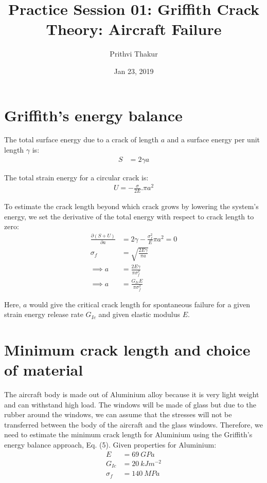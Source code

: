 \documentclass[11pt]{article}
\title{Practice Session 01: Griffith Crack Theory: Aircraft Failure}
\author{Prithvi Thakur}
\date{Jan 23, 2019}
\begin{document}
\maketitle

\section*{Griffith's energy balance}
The total surface energy due to a crack of length $a$ and a surface energy per unit length $\gamma$ is:
\begin{align}
    S &= 2\gamma a
\end{align}

The total strain energy for a circular crack is:
\begin{align}
    U = -\frac{\sigma}{2E}.\pi a^2
\end{align}

To estimate the crack length beyond which crack grows by lowering the system's energy, we set the derivative of the total energy with respect to crack length to zero:
\begin{align}
    \frac{\partial (S+U)}{\partial a} &= 2\gamma - \frac{\sigma_f^2}{E}\pi a^2 = 0 \\
    \sigma_f &= \sqrt{\frac{2E\gamma}{\pi a}} \\
    \implies a &= \frac{2E\gamma}{\pi \sigma_f^2} \\
    \implies a &= \frac{G_{Ic}E}{\pi \sigma_f^2}
\end{align}

Here, $a$ would give the critical crack length for spontaneous failure for a given strain energy release rate $G_{Ic}$ and given elastic modulus $E$.

\section*{Minimum crack length and choice of material}
The aircraft body is made out of Aluminium alloy because it is very light weight and can withstand high load. The windows will be made of glass but due to the rubber around the windows, we can assume that the stresses will not be transferred between the body of the aircraft and the glass windows. Therefore, we need to estimate the minimum crack length for Aluminium using the Griffith's energy balance approach, Eq. (5).
Given properties for Aluminium:
\begin{align}
    E &= 69\ GPa \\
    G_{Ic} &= 20\ kJm^{-2} \\
    \sigma_f &= 140\ MPa
\end{align}
\end{document}
